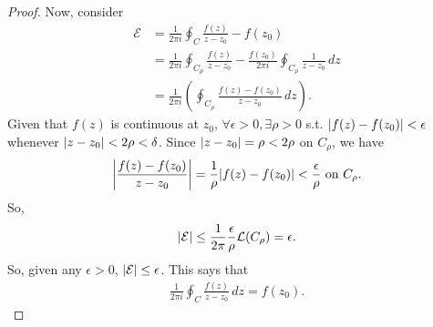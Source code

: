 \documentclass{article}
\theoremstyle{definition}
\newcommand{\f}[2]{\frac{#1}{#2}}
\newcommand{\lag}{\mathcal{L}}
\newcommand{\E}{\mathcal{E}}
\newcommand{\lp}{\left(}
\newcommand{\rp}{\right)}
\newcommand{\nn}{\nonumber}
\begin{document}
\begin{proof}
	Now, consider
	\begin{align}
	\E &= \f{1}{2\pi i}\oint_C \f{f(z)}{z-z_0} - f(z_0)\nn\\
	&=\f{1}{2\pi i}\oint_{C_\rho} \f{f(z)}{z-z_0} - \f{f(z_0)}{2\pi i}\oint_{C_\rho}\f{1}{z-z_0}\,dz\nn\\
	&= \f{1}{2\pi i}\lp \oint_{C_\rho}\f{f(z) - f(z_0)}{z - z_0} \,dz\rp.
	\end{align}
	Given that $f(z)$ is continuous at $z_0$, $\forall \epsilon > 0, \exists \rho > 0 $ s.t. $\abs{f(z) - f(z_0)} < \epsilon$ whenever $\abs{z - z_0} < 2\rho < \delta$. Since $\abs{z - z_0} = \rho < 2\rho $ on $C_\rho$, we have
	\begin{align}
	\abs{\f{f(z) - f(z_0)}{z - z_0}} = \f{1}{\rho}\abs{f(z) - f(z_0)} < \f{\epsilon}{\rho} \text{ on } C_\rho.
	\end{align}
	So, 
	\begin{align}
	\abs{\E} \leq \f{1}{2\pi}\f{\epsilon}{\rho}\lag(C_\rho) = \epsilon.
	\end{align}
	So, given any $\epsilon > 0$, $\abs{\E} \leq \epsilon$. This says that 
	\begin{align}
	\f{1}{2\pi i}\oint_C \f{f(z)}{z - z_0} \,dz = f(z_0).
	\end{align}
\end{proof}
\end{document}

